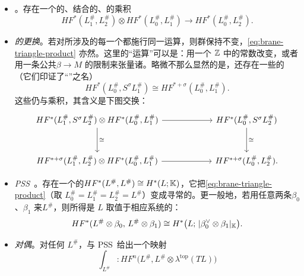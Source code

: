 \begin{itemize}
\item \emph{\trTriangleProduct}。存在一个\trGraded{}的、结合的、\trUnital{}的乘积
\begin{equation}\label{eq:brane-triangle-product}
HF^*(L_1^{\#},L_2^{\#})\otimes HF^*(L_0^{\#},L_1^{\#})
\longrightarrow HF^*(L_0^{\#},L_2^{\#}).
\end{equation}
\item \emph{\trBraneStructure{}的更换}。若对所涉及的每一个\trBrane{}都施行同一运算，则\trFloerCohomology{}群保持不变，\eqref{eq:brane-triangle-product} 亦然。这里的“运算”可以是：用一个 $\mathbb{Z}$ 中的常数改变\trGrading，或者用一条公共\trLineBundle{}$\beta\to M$ 的限制来张量诸\trPinStructure。略微不那么显然的是，还存在一些\trCanonical{}的\trIsomorphism（它们印证了“\trSuspension”之名）
\begin{equation}\label{eq:brane-shift-iso}
HF^*(L_0^{\#},S^{\sigma}L_1^{\#})\cong HF^{*+\sigma}(L_0^{\#},L_1^{\#}).
\end{equation}
这些\trIsomorphism{}仍与乘积\trCompatible，其含义是下图交换：
\begin{equation}\label{eq:brane-shift-product-diagram}
\begin{tikzcd}[column sep=6em,row sep=3em]
HF^*(L_1^{\#},S^{\sigma}L_2^{\#})\otimes HF^*(L_0^{\#},L_1^{\#})
\ar[r]\ar[d,"\cong"]
&
HF^*(L_0^{\#},S^{\sigma}L_2^{\#})
\ar[d,"\cong"]
\\
HF^{*+\sigma}(L_1^{\#},L_2^{\#})\otimes HF^*(L_0^{\#},L_1^{\#})
\ar[r]
&
HF^{*+\sigma}(L_0^{\#},L_2^{\#}).
\end{tikzcd}
\end{equation}
\item \emph{PSS~\trIsomorphism}。存在一个\trCanonical{}的\trIsomorphism{}$HF^*(L^{\#},L^{\#})\cong H^*(L;\mathbb{K})$，它把\eqref{eq:brane-triangle-product}（取 $L_0^{\#}=L_1^{\#}=L_2^{\#}=L^{\#}$）变成寻常的\trCupProduct。更一般地，若用任意两条\trLineBundle{}$\beta_0$、$\beta_1$ 来\trTwisted{}$L^{\#}$，则所得是 $L$ 取值于相应\trLocalCoefficient{}系统的\trCohomology：
\begin{equation}\label{eq:pss-twisted-cohomology}
HF^*(L^{\#}\otimes\beta_0,\,L^{\#}\otimes\beta_1)\cong H^*\bigl(L;\,|\beta_0^{\vee}\otimes\beta_1|_{\mathbb{K}}\bigr).
\end{equation}
\item \emph{对偶}。对任何 $L^{\#}$，\trPoincareDuality{}与 PSS~\trIsomorphism{}给出一个映射
\begin{equation}\label{eq:brane-duality-map}
\int_{L^{\#}}\colon
HF^n\bigl(L^{\#},L^{\#}\otimes\lambda^{\mathrm{top}}(TL)\bigr)

\end{equation}
\end{itemize}
